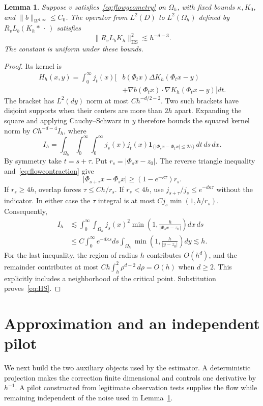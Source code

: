 \documentclass[11pt]{article}
\newtheorem{lemma}[theorem]{Lemma}
\theoremstyle{remark}
\newcommand{\HS}{\mathrm{HS}}
\newcommand{\norm}[1]{\lVert #1\rVert}
\newcommand{\abs}[1]{\lvert #1\rvert}
\begin{document}
\begin{lemma}\label{lem:variance}
Suppose $v$ satisfies~\eqref{eq:flowgeometry} on $\Omega_h$, with fixed bounds $\kappa,K_0$, and $\norm b_{W^{1,\infty}}\le C_0$. The operator from $L^2(D)$ to $L^2(\Omega_h)$ defined by $R_vL_b(K_h*\,\cdot\,)$ satisfies
\begin{equation}\label{eq:HS}
 \norm{R_vL_bK_h}_{\HS}^2\lesssim h^{-d-3}.
\end{equation}
The constant is uniform under these bounds.
\end{lemma}
\begin{proof}
Its kernel is
\begin{align*}
 H_h(x,y)=\int_0^\infty j_t(x)\big[&b(\Phi_tx)\Delta K_h(\Phi_tx-y)\\
 &+\nabla b(\Phi_tx)\cdot\nabla K_h(\Phi_tx-y)\big]dt.
\end{align*}
The bracket has $L^2(dy)$ norm at most $Ch^{-d/2-2}$. Two such brackets have disjoint supports when their centers are more than $2h$ apart. Expanding the square and applying Cauchy--Schwarz in $y$ therefore bounds the squared kernel norm by $Ch^{-d-4}I_h$, where
\[
 I_h=\int_{\Omega_h}\int_0^\infty\int_0^\infty
 j_s(x)j_t(x)\mathbf1_{\{\abs{\Phi_sx-\Phi_tx}\le2h\}}\,dt\,ds\,dx.
\]
By symmetry take $t=s+\tau$. Put $r_s=\abs{\Phi_sx-z_0}$. The reverse triangle inequality and~\eqref{eq:flowcontraction} give
\[
 \abs{\Phi_{s+\tau}x-\Phi_sx}\ge(1-e^{-\kappa\tau})r_s.
\]
If $r_s\ge4h$, overlap forces $\tau\le Ch/r_s$. If $r_s<4h$, use $j_{s+\tau}/j_s\le e^{-d\kappa\tau}$ without the indicator. In either case the $\tau$ integral is at most $Cj_s\min(1,h/r_s)$. Consequently,
\begin{align*}
 I_h&\lesssim\int_0^\infty\int_{\Omega_h}
 j_s(x)^2\min\left(1,\frac h{\abs{\Phi_sx-z_0}}\right)dx\,ds\\
 &\le C\int_0^\infty e^{-d\kappa s}ds
 \int_{\Omega_h}\min\left(1,\frac h{\abs{y-z_0}}\right)dy
 \lesssim h.
\end{align*}
For the last inequality, the region of radius $h$ contributes $O(h^d)$, and the remainder contributes at most $Ch\int_h^2\rho^{d-2}\,d\rho=O(h)$ when $d\ge2$. This explicitly includes a neighborhood of the critical point. Substitution proves~\eqref{eq:HS}.
\end{proof}

\section{Approximation and an independent pilot}\label{sec:construction}
We next build the two auxiliary objects used by the estimator. A deterministic projection makes the correction finite dimensional and controls one derivative by $h^{-1}$. A pilot constructed from legitimate observation tests supplies the flow while remaining independent of the noise used in Lemma~\ref{lem:variance}.
\end{document}
